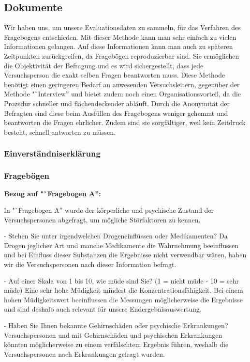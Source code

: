 \documentclass{Bericht}
\begin{document}
\subsection{Dokumente}
Wir haben uns, um unsere Evaluationsdaten zu sammeln, für das Verfahren des Fragebogens entschieden. Mit dieser Methode kann man sehr einfach zu vielen Informationen gelangen. Auf diese Informationen kann man auch zu späteren Zeitpunkten zurückgreifen, da Fragebögen reproduzierbar sind. Sie ermöglichen die Objektivität der Befragung und es wird sichergestellt, dass jede Versuchsperson die exakt selben Fragen beantworten muss. Diese Methode benötigt einen geringeren Bedarf an anwesenden Versuchsleitern, gegenüber der Methode "`Interview'' und bietet zudem noch einen Organisationsvorteil, da die Prozedur schneller und flächendeckender abläuft. Durch die Anonymität der Befragten sind diese beim Ausfüllen des Fragebogens weniger gehemmt und beantworten die Fragen ehrlicher. Zudem sind sie sorgfältiger, weil kein Zeitdruck besteht, schnell antworten zu müssen.

\subsubsection{Einverständniserklärung}

\subsubsection{Fragebögen}
\label{subsec:fragebogen}
\textbf{Bezug auf "`Fragebogen A'':}

In "`Fragebogen A'' wurde der körperliche und psychische Zustand der Versuchspersonen abgefragt, um mögliche Störfaktoren zu kennen.

- Stehen Sie unter irgendwelchen Drogeneinflüssen oder Medikamenten?
Da Drogen jeglicher Art und manche Medikamente die Wahrnehmung beeinflussen und bei Einfluss dieser Substanzen die Ergebnisse nicht verwendbar wären, haben wir die Versuchspersonen nach dieser Information befragt.

- Auf einer Skala von 1 bis 10, wie müde sind Sie? (1 = nicht müde - 10 = sehr müde)
Eine sehr hohe Müdigkeit mindert die Konzentrationsfähigkeit. Bei einem hohen Müdigkeitswert beeinflussen die Messungen möglicherweise die Ergebnisse und sind deshalb auch relevant für unsere Endergebnisauswertung.

- Haben Sie Ihnen bekannte Gehirnschäden oder psychische Erkrankungen?
Versuchspersonen und mit Gehirnschäden und psychischen Erkrankungen könnten möglicherweise zu einem verfälschtem Ergebnis führen, weshalb die Versuchspersonen nach Erkrankungen gefragt wurden.
\end{document}

